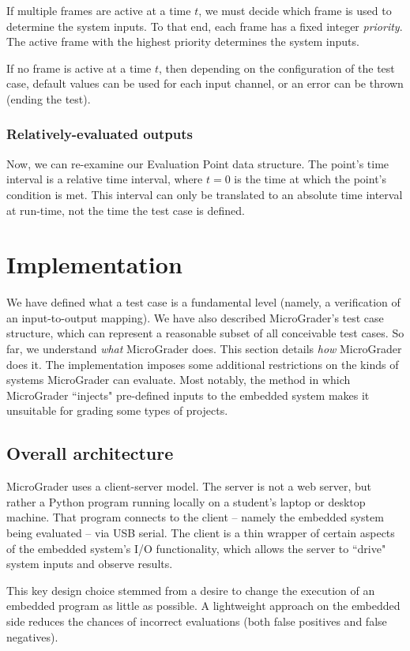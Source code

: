\documentclass[12pt]{article}
\begin{document}
If multiple frames are active at a time $t$, we must decide which frame is used to determine the system inputs.  To that end, each frame has a fixed integer \textit{priority}.  The active frame with the highest priority determines the system inputs.

If no frame is active at a time $t$, then depending on the configuration of the test case, default values can be used for each input channel, or an error can be thrown (ending the test).

\subsubsection{Relatively-evaluated outputs}
Now, we can re-examine our Evaluation Point data structure.  The point's time interval is a relative time interval, where $t=0$ is the time at which the point's condition is met.  This interval can only be translated to an absolute time interval at run-time, not the time the test case is defined.

\newpage
\section{Implementation}
We have defined what a test case is a fundamental level (namely, a verification of an input-to-output mapping).  We have also described MicroGrader's test case structure, which can represent a reasonable subset of all conceivable test cases.  So far, we understand \textit{what} MicroGrader does.  This section details \textit{how} MicroGrader does it.  The implementation imposes some additional restrictions on the kinds of systems MicroGrader can evaluate.  Most notably, the method in which MicroGrader ``injects" pre-defined inputs to the embedded system makes it unsuitable for grading some types of projects.

\subsection{Overall architecture}
\label{sec:architecture}
MicroGrader uses a client-server model.  The server is not a web server, but rather a Python program running locally on a student's laptop or desktop machine.  That program connects to the client -- namely the embedded system being evaluated -- via USB serial.  The client is a thin wrapper of certain aspects of the embedded system's I/O functionality, which allows the server to ``drive" system inputs and observe results.

This key design choice stemmed from a desire to change the execution of an embedded program as little as possible.  A lightweight approach on the embedded side reduces the chances of incorrect evaluations (both false positives and false negatives).
\end{document}
